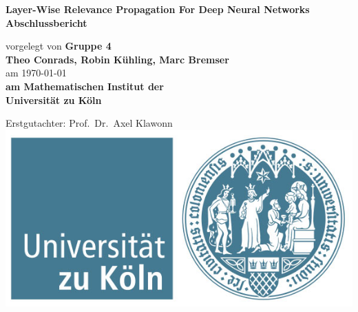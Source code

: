 \documentclass[11pt,a4paper]{scrbook}
\begin{document}
\begin{titlepage}
\begin{center}
\huge \textbf{{Layer-Wise Relevance Propagation For Deep Neural Networks}} \\
\vspace{2cm}
\LARGE\textbf{{Abschlussbericht}}\\
\vspace{2cm}
\normalsize


vorgelegt von  \textbf{Gruppe 4\\ Theo Conrads, Robin Kühling, Marc Bremser}\\
am \today \\
\vspace{2.5cm}
\textbf{am Mathematischen Institut der \\Universit\"at zu K\"oln}\\
\vspace{3cm}
\end{center}
\normalsize{
\begin{center}
Erstgutachter:  {Prof.~Dr.~Axel Klawonn} \\
\vfill
\includegraphics[scale=0.25]{uzk_logo} %
\end{center}
}
\end{titlepage}


\pagestyle{plain}
\cleardoublepage
\setcounter{page}{1}
\tableofcontents

\listoffigures
{}

\listoftables
{}

\cleardoublepage









{}

%
\end{document}
